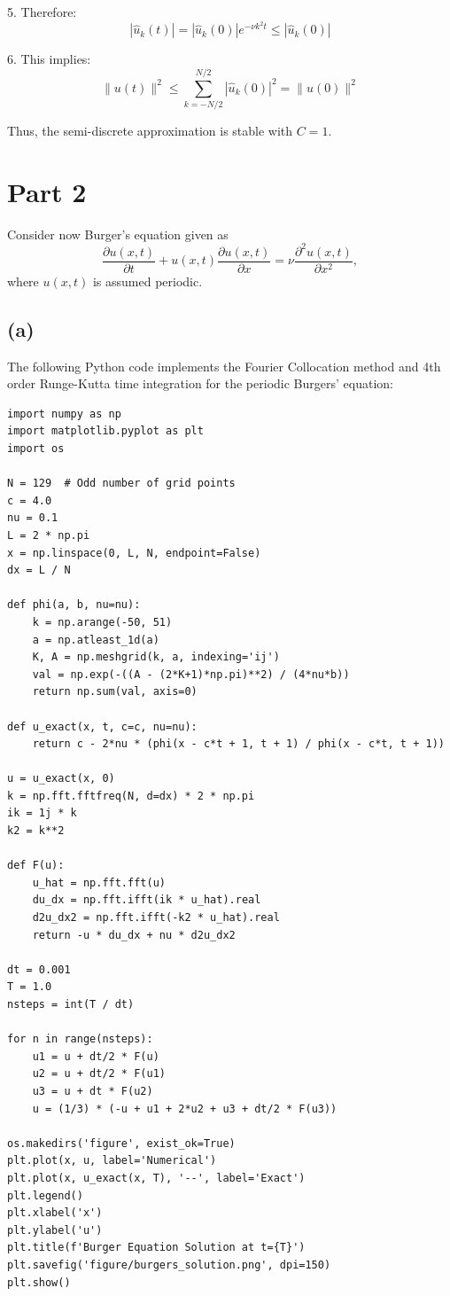 \documentclass{article}
\begin{document}
5. Therefore:
\begin{equation}
    |\hat{u}_k(t)| = |\hat{u}_k(0)|e^{-\nu k^2t} \leq |\hat{u}_k(0)|
\end{equation}

6. This implies:
\begin{equation}
    \|u(t)\|^2 \leq \sum_{k=-N/2}^{N/2} |\hat{u}_k(0)|^2 = \|u(0)\|^2
\end{equation}

Thus, the semi-discrete approximation is stable with $C = 1$.

\section*{Part 2}
Consider now Burger's equation given as
\begin{equation}
    \frac{\partial u(x, t)}{\partial t} + u(x, t) \frac{\partial u(x, t)}{\partial x} = \nu \frac{\partial^2 u(x, t)}{\partial x^2},
\end{equation}
where $u(x, t)$ is assumed periodic. 

\subsection*{(a)}
The following Python code implements the Fourier Collocation method and 4th order Runge-Kutta time integration for the periodic Burgers' equation:

\begin{lstlisting}
import numpy as np
import matplotlib.pyplot as plt
import os

N = 129  # Odd number of grid points
c = 4.0
nu = 0.1
L = 2 * np.pi
x = np.linspace(0, L, N, endpoint=False)
dx = L / N

def phi(a, b, nu=nu):
    k = np.arange(-50, 51)
    a = np.atleast_1d(a)
    K, A = np.meshgrid(k, a, indexing='ij')
    val = np.exp(-((A - (2*K+1)*np.pi)**2) / (4*nu*b))
    return np.sum(val, axis=0)

def u_exact(x, t, c=c, nu=nu):
    return c - 2*nu * (phi(x - c*t + 1, t + 1) / phi(x - c*t, t + 1))

u = u_exact(x, 0)
k = np.fft.fftfreq(N, d=dx) * 2 * np.pi
ik = 1j * k
k2 = k**2

def F(u):
    u_hat = np.fft.fft(u)
    du_dx = np.fft.ifft(ik * u_hat).real
    d2u_dx2 = np.fft.ifft(-k2 * u_hat).real
    return -u * du_dx + nu * d2u_dx2

dt = 0.001
T = 1.0
nsteps = int(T / dt)

for n in range(nsteps):
    u1 = u + dt/2 * F(u)
    u2 = u + dt/2 * F(u1)
    u3 = u + dt * F(u2)
    u = (1/3) * (-u + u1 + 2*u2 + u3 + dt/2 * F(u3))

os.makedirs('figure', exist_ok=True)
plt.plot(x, u, label='Numerical')
plt.plot(x, u_exact(x, T), '--', label='Exact')
plt.legend()
plt.xlabel('x')
plt.ylabel('u')
plt.title(f'Burger Equation Solution at t={T}')
plt.savefig('figure/burgers_solution.png', dpi=150)
plt.show()
\end{lstlisting}
\end{document}
